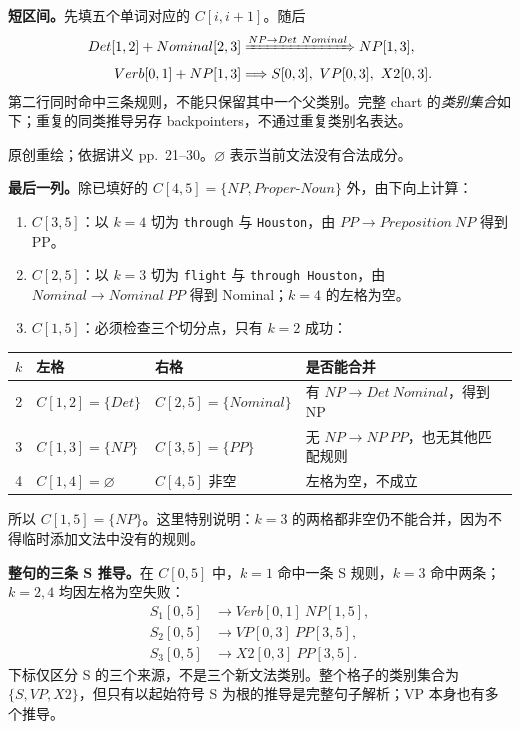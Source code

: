\begin{workedsolution}
\textbf{短区间。}先填五个单词对应的 $C[i,i+1]$。随后
\[
\begin{aligned}
  Det[1,2]+Nominal[2,3]&\xRightarrow{NP\rightarrow Det\ Nominal}NP[1,3],\\
  Verb[0,1]+NP[1,3]&\Longrightarrow S[0,3],\ VP[0,3],\ X2[0,3].
\end{aligned}
\]
第二行同时命中三条规则，不能只保留其中一个父类别。完整 chart 的\emph{类别集合}如下；重复的同类推导另存 backpointers，不通过重复类别名表达。

\begin{center}
  

  {\small 原创重绘；依据讲义 pp.~21--30。$\varnothing$ 表示当前文法没有合法成分。}
\end{center}

\textbf{最后一列。}除已填好的 $C[4,5]=\{NP,Proper\text{-}Noun\}$ 外，由下向上计算：
\begin{enumerate}
  \item $C[3,5]$：以 $k=4$ 切为 \texttt{through} 与 \texttt{Houston}，由 $PP\rightarrow Preposition\ NP$ 得到 PP。
  \item $C[2,5]$：以 $k=3$ 切为 \texttt{flight} 与 \texttt{through Houston}，由 $Nominal\rightarrow Nominal\ PP$ 得到 Nominal；$k=4$ 的左格为空。
  \item $C[1,5]$：必须检查三个切分点，只有 $k=2$ 成功：
\end{enumerate}

\begin{center}
\small
\begin{tabularx}{\textwidth}{@{}cllX@{}}
  \toprule
  $k$ & 左格 & 右格 & 是否能合并 \\
  \midrule
  2 & $C[1,2]=\{Det\}$ & $C[2,5]=\{Nominal\}$ & 有 $NP\rightarrow Det\ Nominal$，得到 NP \\
  3 & $C[1,3]=\{NP\}$ & $C[3,5]=\{PP\}$ & 无 $NP\rightarrow NP\ PP$，也无其他匹配规则 \\
  4 & $C[1,4]=\varnothing$ & $C[4,5]$ 非空 & 左格为空，不成立 \\
  \bottomrule
\end{tabularx}
\end{center}

所以 $C[1,5]=\{NP\}$。这里特别说明：$k=3$ 的两格都非空仍不能合并，因为不得临时添加文法中没有的规则。

\textbf{整句的三条 S 推导。}在 $C[0,5]$ 中，$k=1$ 命中一条 S 规则，$k=3$ 命中两条；$k=2,4$ 均因左格为空失败：
\[
\begin{aligned}
  S_1[0,5]&\rightarrow Verb[0,1]\ NP[1,5],\\
  S_2[0,5]&\rightarrow VP[0,3]\ PP[3,5],\\
  S_3[0,5]&\rightarrow X2[0,3]\ PP[3,5].
\end{aligned}
\]
下标仅区分 S 的三个来源，不是三个新文法类别。整个格子的类别集合为 $\{S,VP,X2\}$，但只有以起始符号 S 为根的推导是完整句子解析；VP 本身也有多个推导。


\end{workedsolution}
